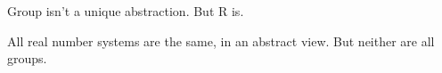 Group isn't a unique abstraction. But R is.

All real number systems are the same, in an abstract view. But neither are all groups.
